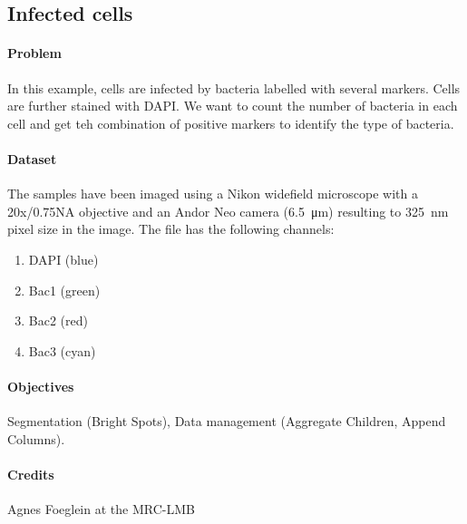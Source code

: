 \subsection{Infected cells}

\paragraph{Problem}

In this example, cells are infected by bacteria labelled with several markers. Cells are further stained with DAPI. We want to count the number of bacteria in each cell and get teh combination of positive markers to identify the type of bacteria.


\paragraph{Dataset} 
The samples have been imaged using a Nikon widefield microscope with a 20x/0.75NA objective and an Andor Neo camera (\SI{6.5}{\micro\meter}) resulting to \SI{325}{\nano\meter} pixel size in the image. The file  has the following channels:
\begin{enumerate}\itemsep0em
    \item DAPI (blue)
    \item Bac1 (green)
    \item Bac2 (red)
    \item Bac3 (cyan)
\end{enumerate}

\paragraph{Objectives} Segmentation (Bright Spots), Data management (Aggregate Children, Append Columns).

\paragraph{Credits} Agnes Foeglein at the MRC-LMB

